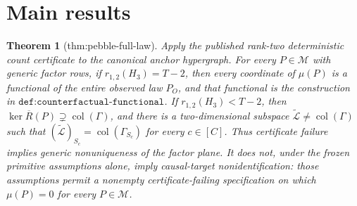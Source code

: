 \documentclass{article}
\newtheorem{theorem}{Theorem}
\begin{document}
\section{Main results}

\begin{theorem}[thm:pebble-full-law]\label{thm:pebble-full-law}
Apply the published rank-two deterministic count certificate to the canonical anchor hypergraph. For every \(P\in\mathcal M\) with generic factor rows, if \(r_{1,2}(H_3)=T-2\), then every coordinate of \(\mu(P)\) is a functional of the entire observed law \(P_O\), and that functional is the construction in \(\texttt{def:counterfactual-functional}\). If \(r_{1,2}(H_3)<T-2\), then \(\ker\overline R(P)\supsetneq\operatorname{col}(\Gamma)\), and there is a two-dimensional subspace \(\widetilde{\mathcal L}\neq\operatorname{col}(\Gamma)\) such that \((\widetilde{\mathcal L})_{S_c}=\operatorname{col}(\Gamma_{S_c})\) for every \(c\in[C]\). Thus certificate failure implies generic nonuniqueness of the factor plane. It does not, under the frozen primitive assumptions alone, imply causal-target nonidentification: those assumptions permit a nonempty certificate-failing specification on which \(\mu(P)=0\) for every \(P\in\mathcal M\).
\end{theorem}
\end{document}
